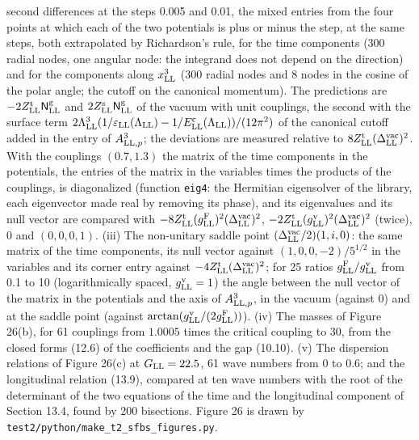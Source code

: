 \documentclass[
  10pt,
]{article}
\begin{document}
second differences at the steps 0.005 and 0.01, the mixed entries from
the four points at which each of the two potentials is plus or minus the
step, at the same steps, both extrapolated by Richardson's rule, for the
time components (300 radial nodes, one angular node: the integrand does
not depend on the direction) and for the components along
\(x^3_{\rm LL}\) (300 radial nodes and 8 nodes in the cosine of the
polar angle; the cutoff on the canonical momentum). The predictions are
\(-2Z^{\rm t}_{\rm LL}\mathsf N^{\rm g}_{\rm LL}\) and
\(2Z^{\rm s}_{\rm LL}\mathsf N^{\rm g}_{\rm LL}\) of the vacuum with
unit couplings, the second with the surface term
\(2\Lambda_{\rm LL}^3(1/\varepsilon_{\rm LL}(\Lambda_{\rm LL})-1/E^{\rm c}_{\rm LL}(\Lambda_{\rm LL}))/(12\pi^2)\)
of the canonical cutoff added in the entry of \(A^3_{{\rm LL},p}\); the
deviations are measured relative to
\(8Z^{\rm t}_{\rm LL}(\Delta^{\rm vac}_{\rm LL})^2\). With the couplings
\((0.7,1.3)\) the matrix of the time components in the potentials, the
entries of the matrix in the variables times the products of the
couplings, is diagonalized (function \texttt{eig4}: the Hermitian
eigensolver of the library, each eigenvector made real by removing its
phase), and its eigenvalues and its null vector are compared with
\(-8Z^{\rm t}_{\rm LL}(g^{\rm F}_{\rm LL})^2(\Delta^{\rm vac}_{\rm LL})^2\),
\(-2Z^{\rm t}_{\rm LL}(g^{\rm v}_{\rm LL})^2(\Delta^{\rm vac}_{\rm LL})^2\)
(twice), 0 and \((0,0,0,1)\). (iii) The non-unitary saddle point
\((\Delta^{\rm vac}_{\rm LL}/2)(1,i,0)\): the same matrix of the time
components, its null vector against \((1,0,0,-2)/5^{1/2}\) in the
variables and its corner entry against
\(-4Z^{\rm t}_{\rm LL}(\Delta^{\rm vac}_{\rm LL})^2\); for 25 ratios
\(g^{\rm F}_{\rm LL}/g^{\rm v}_{\rm LL}\) from 0.1 to 10
(logarithmically spaced, \(g^{\rm v}_{\rm LL}=1\)) the angle between the
null vector of the matrix in the potentials and the axis of
\(A^3_{{\rm LL},p}\), in the vacuum (against 0) and at the saddle point
(against \(\arctan(g^{\rm v}_{\rm LL}/(2g^{\rm F}_{\rm LL}))\)). (iv)
The masses of Figure 26(b), for 61 couplings from \(1.0005\) times the
critical coupling to 30, from the closed forms (12.6) of the
coefficients and the gap (10.10). (v) The dispersion relations of Figure
26(c) at \(G_{\rm LL}=22.5\), 61 wave numbers from 0 to 0.6; and the
longitudinal relation (13.9), compared at ten wave numbers with the root
of the determinant of the two equations of the time and the longitudinal
component of Section 13.4, found by 200 bisections. Figure 26 is drawn
by \texttt{test2/python/make\_t2\_sfbs\_figures.py}.
\end{document}
